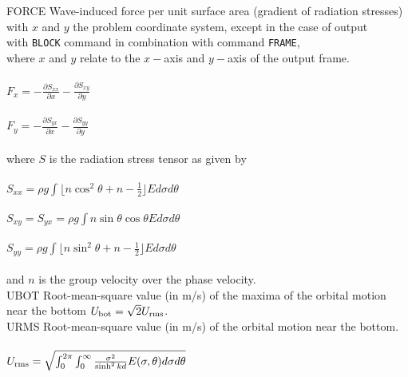 \documentclass[12pt]{book}
\begin{document}
\begin{tabbing}
FORCE                \> Wave-induced force per unit surface area (gradient of radiation stresses)\+\\
                        with $x$ and $y$ the problem coordinate system, except in the case of output\\
                        with {\tt BLOCK} command in
                        combination with command {\tt FRAME},\\
                        where $x$ and $y$ relate to the $x-$axis and $y-$axis of the output frame.\\
                        \\
$F_x = -\frac{\partial S_{xx}}{\partial x} - \frac{\partial S_{xy}}{\partial y}$ \\
                        \\
$F_y = -\frac{\partial S_{yx}}{\partial x} - \frac{\partial S_{yy}}{\partial y}$ \\
                        \\
                        where $S$ is the radiation stress tensor as given by\\
                        \\
$S_{xx} = \rho g \int \lfloor n \cos^2\theta + n - \frac{1}{2} \rfloor E d\sigma d\theta$ \\
                        \\
$S_{xy} = S_{yx} = \rho g \int n \sin\theta \cos\theta E d\sigma d\theta$ \\
                        \\
$S_{yy} = \rho g \int \lfloor n \sin^2\theta + n - \frac{1}{2} \rfloor E d\sigma d\theta$ \\
                        \\
                        and $n$ is the group velocity over the phase velocity.\-\\
UBOT                 \> Root-mean-square value (in m/s) of the maxima of the orbital motion\+\\
                        near the bottom $U_{\rm bot} = \sqrt{2} U_{\rm rms}$.\-\\
URMS                 \> Root-mean-square value (in m/s) of the orbital motion near the bottom.\+\\
                        \\
$U_{\rm rms} = \sqrt{\int_{0}^{2\pi} \int_{0}^{\infty} \frac{\sigma^2}{\sinh^2 kd} E(\sigma,\theta) d\sigma d\theta}$
                        \\
                        \-\\

\end{tabbing}
\end{document}
